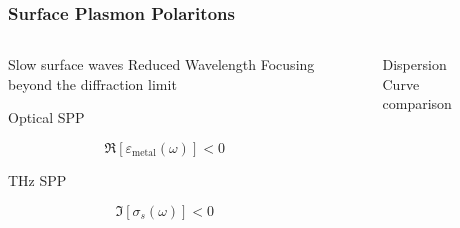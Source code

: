 \documentclass[10pt]{beamer}
\renewcommand{\O}{\omega}  %
\newcommand{\E}{\varepsilon}  %
\begin{document}
\begin{frame}
    \frametitle{Surface Plasmon Polaritons}

    \begin{columns} %
        \begin{column}{.5\textwidth}
            \begin{minipage}[T][.1\textheight][c]{\linewidth}
                \begin{outline}[itemize]
                    \1 Slow surface waves
                    \1 Reduced Wavelength
                    \1 Focusing beyond the diffraction limit
                \end{outline}
                \begin{outline}[itemize]
                    \1 Optical SPP
                \end{outline}
                \setlength{\belowdisplayshortskip}{-7pt}
                \setlength{\abovedisplayshortskip}{2pt}
                \begin{equation} \nonumber
                    \Re \left[ \E_{\text{metal}}(\O)\right] < 0
                \end{equation}
                \begin{outline}[itemize]
                    \1 THz SPP
                \end{outline}
                \begin{equation} \nonumber
                    \Im \left[ \sigma_{s}(\O)\right] < 0
                \end{equation}
            \end{minipage}
        \end{column}
        \begin{column}{.5\textwidth}
            \begin{figure}
                \centering \hspace*{-1.25cm}
                \fontsize{6}{7}\selectfont
                \def\svgwidth{1.1\linewidth}
                
                \label{fig:spp_2deg}
                \caption{Dispersion Curve comparison}
            \end{figure}
        \end{column}%
    \end{columns}
\end{frame}
\end{document}
